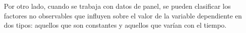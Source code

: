 \documentclass[../../main.tex]{subfiles}
\begin{document}
Por otro lado, cuando se trabaja con datos de panel, se pueden clasificar los factores no
observables que influyen sobre el valor de la variable dependiente en dos tipos: aquellos
que son constantes y aquellos que varían con el tiempo.







\end{document}
